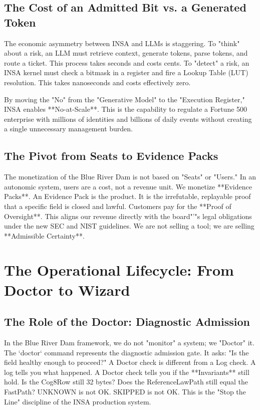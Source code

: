 \documentclass[12pt,a4paper,oneside]{book}
\begin{document}
\section{The Cost of an Admitted Bit vs. a Generated Token}
The economic asymmetry between INSA and LLMs is staggering. To "think" about a risk, an LLM must retrieve context, generate tokens, parse tokens, and route a ticket. This process takes seconds and costs cents. To "detect" a risk, an INSA kernel must check a bitmask in a register and fire a Lookup Table (LUT) resolution. This takes nanoseconds and costs effectively zero. 

By moving the "No" from the "Generative Model" to the "Execution Register," INSA enables **No-at-Scale**. This is the capability to regulate a Fortune 500 enterprise with millions of identities and billions of daily events without creating a single unnecessary management burden.

\section{The Pivot from Seats to Evidence Packs}
The monetization of the Blue River Dam is not based on "Seats" or "Users." In an autonomic system, users are a cost, not a revenue unit. We monetize **Evidence Packs**. An Evidence Pack is the product. It is the irrefutable, replayable proof that a specific field is closed and lawful. Customers pay for the **Proof of Oversight**. This aligns our revenue directly with the board"'"s legal obligations under the new SEC and NIST guidelines. We are not selling a tool; we are selling **Admissible Certainty**.

\chapter{The Operational Lifecycle: From Doctor to Wizard}

\section{The Role of the Doctor: Diagnostic Admission}
In the Blue River Dam framework, we do not "monitor" a system; we "Doctor" it. The `doctor` command represents the diagnostic admission gate. It asks: "Is the field healthy enough to proceed?" A Doctor check is different from a Log check. A log tells you what happened. A Doctor check tells you if the **Invariants** still hold. Is the Cog8Row still 32 bytes? Does the ReferenceLawPath still equal the FastPath? UNKNOWN is not OK. SKIPPED is not OK. This is the "Stop the Line" discipline of the INSA production system.
\end{document}
